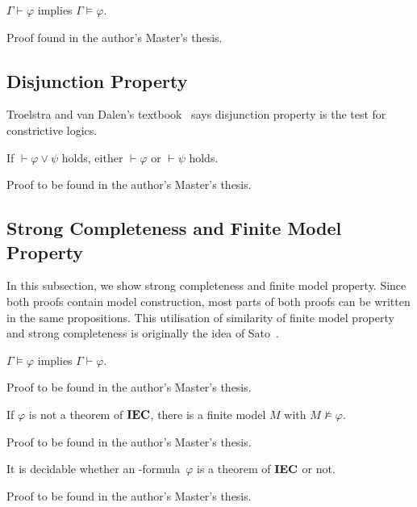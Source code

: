   \begin{proposition}[Soundness]
   \label{soundness}
   $\Gamma\vdash\varphi$ implies $\Gamma\models\varphi$.
  \end{proposition}
  Proof found in the author's Master's thesis.

  \subsection{Disjunction Property}

  Troelstra and van Dalen's
  textbook~\cite[3.5]{troelstra1988constructivism} says
  disjunction property is the test for constrictive logics.

   \begin{proposition}
    \label{disjunction-property}
    If $\vdash\varphi\vee\psi$ holds, either $\vdash\varphi$ or $\vdash\psi$ holds.
   \end{proposition}
   Proof to be found in the author's Master's thesis.

  \subsection{Strong Completeness and Finite Model Property}

  In this subsection, we show strong completeness and finite model property.
  Since both proofs contain model construction,
  most parts of both proofs can be written in the same propositions.
  This utilisation of similarity of finite model property and strong completeness
  is originally the idea of
  Sato~\cite{sato13study}.

  \newcommand{\natpls}{{\mathbb N}^{+}}

\begin{proposition}
 \label{strong-completeness}
 $\Gamma\models\varphi$ implies $\Gamma\vdash\varphi$.
\end{proposition}
Proof to be found in the author's Master's thesis.

\begin{proposition}
 \label{fmp}
 If $\varphi$ is not a theorem of ${\rm {\textbf{IEC}}}$,
 there is a finite model $M$ with $M\not\models\varphi$.
\end{proposition}
Proof to be found in the author's Master's thesis.

\begin{proposition}[Decidability]
 \label{decidability}
 It is decidable whether an \iec-formula~$\varphi$ is a theorem of ${\rm {\textbf{IEC}}}$ or not.
\end{proposition}
Proof to be found in the author's Master's thesis.

